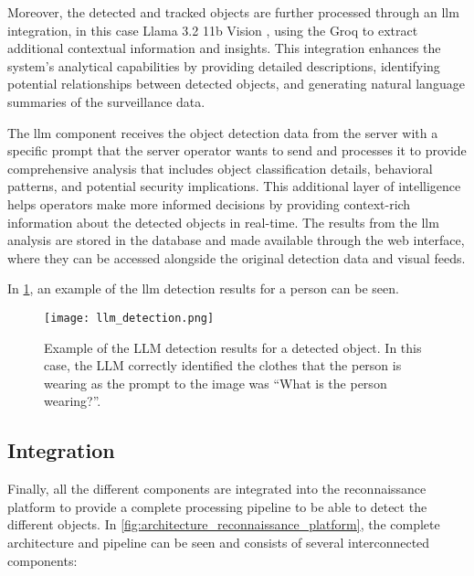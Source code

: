 Moreover, the detected and tracked objects are further processed through an \gls{llm} integration, in this case Llama 3.2 11b Vision \autocite{llama3.211bvision}, using the Groq  to extract additional contextual information and insights. This integration enhances the system's analytical capabilities by providing detailed descriptions, identifying potential relationships between detected objects, and generating natural language summaries of the surveillance data.

The \gls{llm} component receives the object detection data from the server with a specific prompt that the server operator wants to send and processes it to provide comprehensive analysis that includes object classification details, behavioral patterns, and potential security implications. This additional layer of intelligence helps operators make more informed decisions by providing context-rich information about the detected objects in real-time. The results from the \gls{llm} analysis are stored in the database and made available through the web interface, where they can be accessed alongside the original detection data and visual feeds.

In \cref{fig:llm_detection}, an example of the \gls{llm} detection results for a person can be seen.

\begin{figure}
	\texttt{[image: llm\_detection.png]}
	\caption{Example of the LLM detection results for a detected object. In this case, the LLM correctly identified the clothes that the person is wearing as the prompt to the image was ``What is the person wearing?''.}\label{fig:llm_detection}
\end{figure}

\subsection{Integration}\label{subsec:implementation_integration}

Finally, all the different components are integrated into the reconnaissance platform to provide a complete processing pipeline to be able to detect the different objects. In \cref{fig:architecture_reconnaissance_platform}, the complete architecture and pipeline can be seen and consists of several interconnected components:

